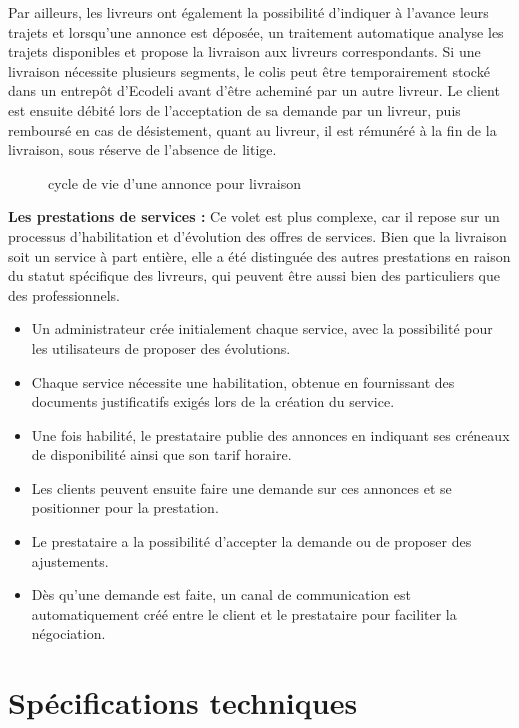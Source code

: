\documentclass{report}
\begin{document}
\noindent Par ailleurs, les livreurs ont également la possibilité d’indiquer à l’avance leurs trajets et lorsqu’une annonce est déposée, un traitement automatique analyse les trajets disponibles et propose la livraison aux livreurs correspondants. Si une livraison nécessite plusieurs segments, le colis peut être temporairement stocké dans un entrepôt d'Ecodeli avant d’être acheminé par un autre livreur. Le client est ensuite débité lors de l’acceptation de sa demande par un livreur, puis remboursé en cas de désistement, quant au livreur, il est rémunéré à la fin de la livraison, sous réserve de l’absence de litige. 
\vspace{0.2cm}
\begin{figure}[H]
    \centering
    
    \caption{cycle de vie d'une annonce pour livraison}
\end{figure}
\vspace{0.5cm}
\noindent \textbf{Les prestations de services :} Ce volet est plus complexe, car il repose sur un processus d’habilitation et d’évolution des offres de services. Bien que la livraison soit un service à part entière, elle a été distinguée des autres prestations en raison du statut spécifique des livreurs, qui peuvent être aussi bien des particuliers que des professionnels.
\begin{itemize}
    \item Un administrateur crée initialement chaque service, avec la possibilité pour les utilisateurs de proposer des évolutions.
    \item Chaque service nécessite une habilitation, obtenue en fournissant des documents justificatifs exigés lors de la création du service.
    \item Une fois habilité, le prestataire publie des annonces en indiquant ses créneaux de disponibilité ainsi que son tarif horaire.
    \item Les clients peuvent ensuite faire une demande sur ces annonces et se positionner pour la prestation.
    \item Le prestataire a la possibilité d’accepter la demande ou de proposer des ajustements.
    \item Dès qu’une demande est faite, un canal de communication est automatiquement créé entre le client et le prestataire pour faciliter la négociation.
\end{itemize}
\vspace{1cm}

\section*{\centering Spécifications techniques}
\vspace{0.5cm}
\end{document}
